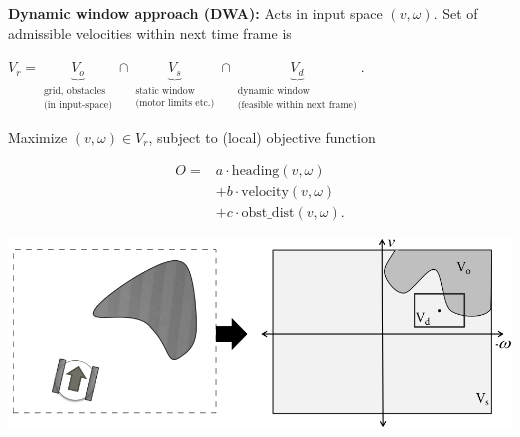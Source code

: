\documentclass[landscape]{article}
\newcommand{\vmspace}{\vspace{-7pt}}
\newcommand{\vpspace}{\vspace{5pt}}
\begin{document}
\begin{multicols}{3}
\begin{minipage}{\columnwidth}
  \textbf{Dynamic window approach (DWA):} Acts in input space $(v,\omega)$. Set
  of admissible velocities within next time frame is
  \vmspace
  \begin{center}
    $
    V_r =
    \underbrace{V_o}_{\substack{\text{grid, obstacles} \\ \text{(in
    input-space)}}}
    \cap \underbrace{V_s}_{\substack{\text{static window} \\ \text{(motor
    limits etc.)}}}
    \cap \underbrace{V_d}_{\substack{\text{dynamic window} \\ \text{(feasible
    within next frame)}}}
    .
    $
  \end{center}
  \vmspace
  Maximize $(v,\omega)\in V_r$, subject to (local) objective function\\
  \vmspace
  \begin{minipage}{0.4\columnwidth}
    \vspace{-18pt}
    \begin{equation*}
      \begin{split}
        O =& a\cdot\mathrm{heading}(v,\omega)\\
        &+ b\cdot\mathrm{velocity}(v,\omega)\\
        &+ c\cdot \mathrm{obst\_dist}(v,\omega).
      \end{split}
    \end{equation*}
  \end{minipage}
  \begin{minipage}{0.59\columnwidth}
  \includegraphics[width=\columnwidth]{img/12_DynamicWindow.png}
  \end{minipage}
\end{minipage}

\vpspace
\vpspace


\end{multicols}
\end{document}

